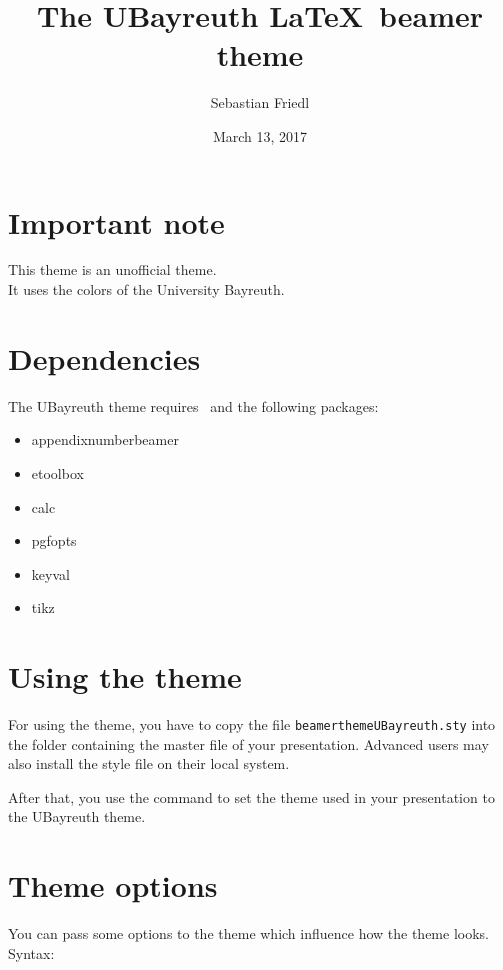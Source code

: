 \documentclass[12pt,a4paper]{scrartcl}
\title{The UBayreuth \LaTeX\ beamer theme}
\author{Sebastian Friedl}
\date{March 13, 2017}
\begin{document}
	\maketitle
	\thispagestyle{empty}
	
	
	\section*{Important note}
	This theme is an unofficial theme. \\
	It uses the colors of the University Bayreuth.
	
		
	\section*{Dependencies}
	The UBayreuth theme requires \LaTeXe\ and the following packages:
	\begin{itemize} \ttfamily
		\item appendixnumberbeamer
		\item etoolbox
		\item calc
		\item pgfopts
		\item keyval
		\item tikz
	\end{itemize}
	
	
	\section{Using the theme}
	For using the theme, you have to copy the file \texttt{beamerthemeUBayreuth.sty} into the folder containing the master file of your presentation. Advanced users may also install the style file on their local system. \par
	After that, you use the command \texttt{} to set the theme used in your presentation to the UBayreuth theme.

	
	\section{Theme options}
	You can pass some options to the theme which influence how the theme looks. \\
	Syntax: \ \ \texttt{} \\\vspace{0.5ex}
	
\end{document}
